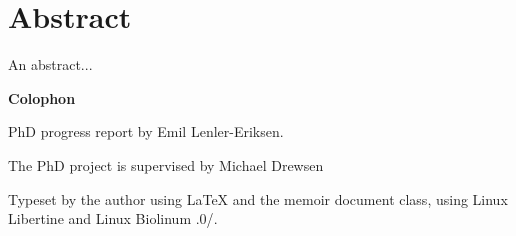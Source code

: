 
\setcounter{page}{2}

\vspace*{0.5cm}
\section*{Abstract}
\thispagestyle{empty}

An abstract...



\makeatletter
\edef\fontandleading{\@memptsize.0/\the\baselineskip}
\makeatother

\strut\vfill
{
  \setlength{\parindent}{0pt}
  \addtolength{\parskip}{.6em}

  \begin{center}
    \bfseries\sffamily Colophon
  \end{center}

  \small

  \textsl{\projecttitle}

  \smallskip

  PhD progress report by Emil Lenler-Eriksen.

  The PhD project is supervised by Michael Drewsen

  Typeset by the author using \LaTeX{} and the \textsf{memoir} document class,
  using Linux Libertine and Linux Biolinum {\fontandleading}.

}